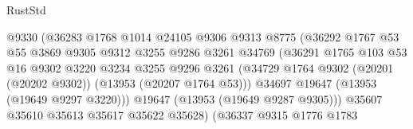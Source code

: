 \begin{lexlean}{RustStd}
\begin{coremodule}
                                        @9330
                                        (@36283
                                          @1768
                                          @1014
                                          @24105
                                          @9306
                                          @9313
                                          @8775
                                          (@36292
                                            @1767
                                            @53
                                            @55
                                            @3869
                                            @9305
                                            @9312
                                            @3255
                                            @9286
                                            @3261
                                            @34769
                                            (@36291
                                              @1765
                                              @103
                                              @53
                                              @16
                                              @9302
                                              @3220
                                              @3234
                                              @3255
                                              @9296
                                              @3261
                                              (@34729
                                                @1764
                                                @9302
                                                (@20201 (@20202 @9302))
                                                (@13953 (@20207 @1764 @53)))
                                              @34697
                                              @19647
                                              (@13953 (@19649 @9297 @3220)))
                                            @19647
                                            (@13953 (@19649 @9287 @9305)))
                                          @35607
                                          @35610
                                          @35613
                                          @35617
                                          @35622
                                          @35628)
                                        (@36337
                                          @9315
                                          @1776
                                          @1783

\end{coremodule}
\end{lexlean}
